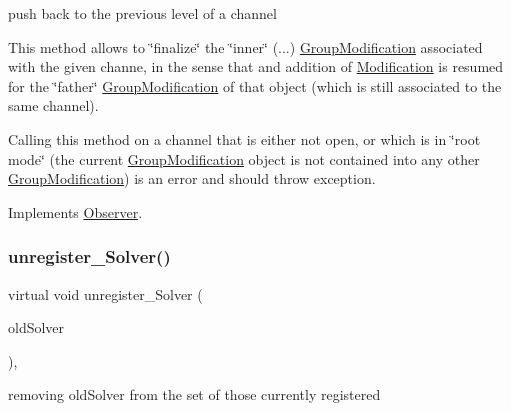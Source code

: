 push back to the previous level of a channel 

This method allows to \char`\"{}finalize\char`\"{} the \char`\"{}inner\char`\"{} (...) \mbox{\hyperlink{class_s_m_spp__di__unipi__it_1_1_group_modification}{Group\+Modification}} associated with the given channe, in the sense that and addition of \mbox{\hyperlink{class_s_m_spp__di__unipi__it_1_1_modification}{Modification}} is resumed for the \char`\"{}father\char`\"{} \mbox{\hyperlink{class_s_m_spp__di__unipi__it_1_1_group_modification}{Group\+Modification}} of that object (which is still associated to the same channel).

Calling this method on a channel that is either not open, or which is in \char`\"{}root mode\char`\"{} (the current \mbox{\hyperlink{class_s_m_spp__di__unipi__it_1_1_group_modification}{Group\+Modification}} object is not contained into any other \mbox{\hyperlink{class_s_m_spp__di__unipi__it_1_1_group_modification}{Group\+Modification}}) is an error and should throw exception. 

Implements \mbox{\hyperlink{class_s_m_spp__di__unipi__it_1_1_observer_a668d3bd70f67db2213601cf671f115d9}{Observer}}.

\mbox{\label{class_s_m_spp__di__unipi__it_1_1_block_a1be1159f846ad7809d2d0c5c2311c92e}} 
\subsubsection{\texorpdfstring{unregister\+\_\+\+Solver()}{unregister\_Solver()}\hspace{0.1cm}{\footnotesize\ttfamily [1/2]}}
{\footnotesize\ttfamily virtual void unregister\+\_\+\+Solver (\begin{DoxyParamCaption}\item[{\mbox{\hyperlink{class_s_m_spp__di__unipi__it_1_1_solver}{Solver}} $\ast$}]{old\+Solver }\end{DoxyParamCaption})\hspace{0.3cm}{\ttfamily [inline]}, {\ttfamily [virtual]}}



removing old\+Solver from the set of those currently registered 

